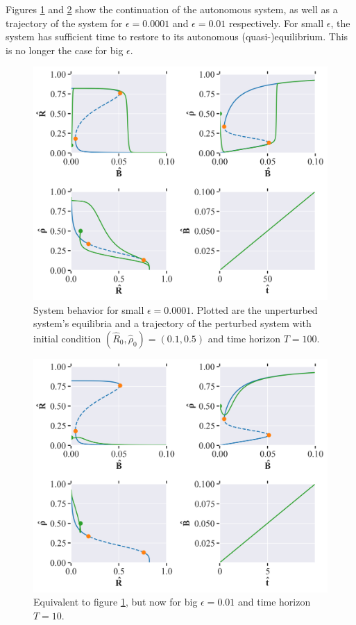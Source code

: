 Figures \ref{fig:cell_biology_ex3_small} and \ref{fig:cell_biology_ex3_big} show the continuation of the autonomous system, as well as a trajectory of the 
system for $\epsilon = 0.0001$ and $\epsilon = 0.01$ respectively. 
For small $\epsilon$, the system has sufficient time to restore to its autonomous (quasi-)equilibrium. This is no longer the case for big $\epsilon$. 
\begin{figure}[H]
    \centering
    \includegraphics[width= \textwidth]{figures/cell_biology_R(0)=0.1_rho(0)=0.5_B(0)_0.0001_eps=0.001_Bmax=0.04.png}
    \caption{System behavior for small $\epsilon = 0.0001$. Plotted are the unperturbed system's equilibria and a trajectory of the perturbed system with initial condition
    $(\hat{R}_0, \hat{\rho}_0) = (0.1, 0.5)$ and time horizon $T = 100$.}
    \label{fig:cell_biology_ex3_small}
\end{figure}

\begin{figure}[H]
    \centering
    \includegraphics[width= \textwidth]{figures/cell_biology_R(0)=0.1_rho(0)=0.5_B(0)_0.0001_eps=0.01_Bmax=0.04.png}
    \caption{Equivalent to figure \ref{fig:cell_biology_ex3_small}, but now for big $\epsilon = 0.01$ and time horizon $T = 10$.}
    \label{fig:cell_biology_ex3_big}
\end{figure}

